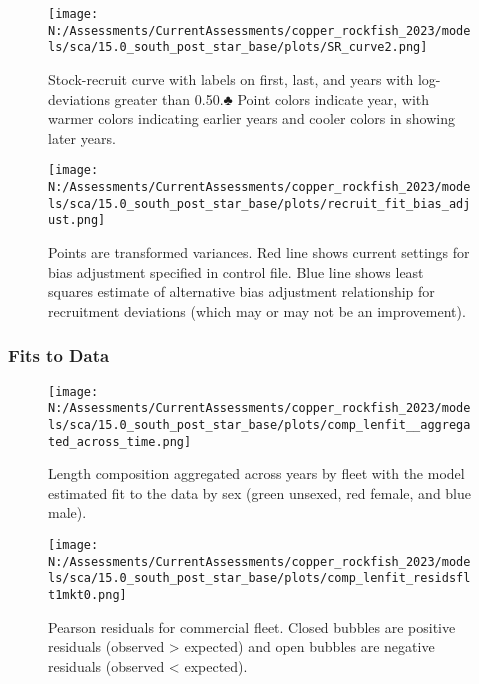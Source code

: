 \documentclass[11pt,
  english,
  letterpaper,
]{article}
\begin{document}
\pagebreak

\begin{figure}
\centering
\texttt{[image: N:/Assessments/CurrentAssessments/copper\_rockfish\_2023/models/sca/15.0\_south\_post\_star\_base/plots/SR\_curve2.png]}
\caption{Stock-recruit curve with labels on first, last, and years with log-deviations greater than 0.50.♣ Point colors indicate year, with warmer colors indicating earlier years and cooler colors in showing later years.\label{fig:bh-curve}}
\end{figure}

\pagebreak

\begin{figure}
\centering
\texttt{[image: N:/Assessments/CurrentAssessments/copper\_rockfish\_2023/models/sca/15.0\_south\_post\_star\_base/plots/recruit\_fit\_bias\_adjust.png]}
\caption{Points are transformed variances. Red line shows current settings for bias adjustment specified in control file. Blue line shows least squares estimate of alternative bias adjustment relationship for recruitment deviations (which may or may not be an improvement).\label{fig:bias-adjust}}
\end{figure}

\newpage

\hypertarget{fits-to-data}{%
\subsubsection{Fits to Data}\label{fits-to-data}}

\begin{figure}
\centering
\texttt{[image: N:/Assessments/CurrentAssessments/copper\_rockfish\_2023/models/sca/15.0\_south\_post\_star\_base/plots/comp\_lenfit\_\_aggregated\_across\_time.png]}
\caption{Length composition aggregated across years by fleet with the model estimated fit to the data by sex (green unsexed, red female, and blue male).\label{fig:len-agg-fit}}
\end{figure}

\pagebreak

\begin{figure}
\centering
\texttt{[image: N:/Assessments/CurrentAssessments/copper\_rockfish\_2023/models/sca/15.0\_south\_post\_star\_base/plots/comp\_lenfit\_residsflt1mkt0.png]}
\caption{Pearson residuals for commercial fleet. Closed bubbles are positive residuals (observed \textgreater{} expected) and open bubbles are negative residuals (observed \textless{} expected).\label{fig:com-dead-pearson}}
\end{figure}
\end{document}
